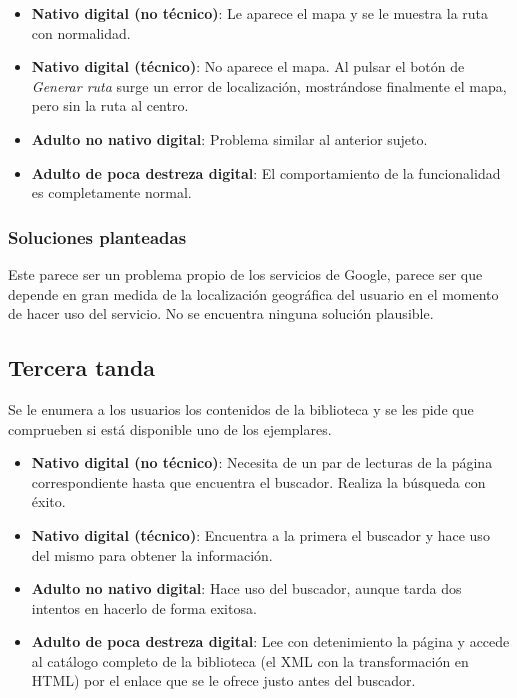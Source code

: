 \documentclass[11pt]{article}
\begin{document}
        \begin{itemize}
            \item \textbf{Nativo digital (no técnico)}: Le aparece el mapa y se le muestra la ruta con normalidad.
            \item \textbf{Nativo digital (técnico)}: No aparece el mapa.
                Al pulsar el botón de \textit{Generar ruta} surge un error de localización, mostrándose finalmente el mapa, pero sin la ruta al centro.
            \item \textbf{Adulto no nativo digital}: Problema similar al anterior sujeto.
            \item \textbf{Adulto de poca destreza digital}: El comportamiento de la funcionalidad es completamente normal.
        \end{itemize}

        \subsubsection{Soluciones planteadas}
        Este parece ser un problema propio de los servicios de Google, parece ser que depende en gran medida de la localización geográfica del usuario en el momento de hacer uso del servicio.
        No se encuentra ninguna solución plausible.

        \subsection{Tercera tanda}
        Se le enumera a los usuarios los contenidos de la biblioteca y se les pide que comprueben si está disponible uno de los ejemplares.

        \begin{itemize}
            \item \textbf{Nativo digital (no técnico)}: Necesita de un par de lecturas de la página correspondiente hasta que encuentra el buscador.
                Realiza la búsqueda con éxito.
            \item \textbf{Nativo digital (técnico)}: Encuentra a la primera el buscador y hace uso del mismo para obtener la información.
            \item \textbf{Adulto no nativo digital}: Hace uso del buscador, aunque tarda dos intentos en hacerlo de forma exitosa.
            \item \textbf{Adulto de poca destreza digital}: Lee con detenimiento la página y accede al catálogo completo de la biblioteca (el XML con la transformación en HTML) por el enlace que se le ofrece justo antes del buscador.
        \end{itemize}
\end{document}
